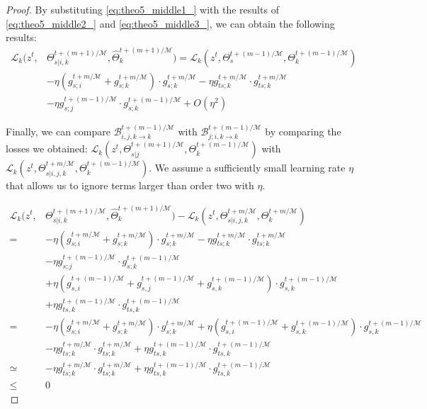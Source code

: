 \begin{proof}
By substituting \cref{eq:theo5_middle1_} with the results of \cref{eq:theo5_middle2_} and \cref{eq:theo5_middle3_}, we can obtain the following results:
\begin{align}
    \mathcal{L}_k(z^t, &\Theta_{s|i,k}^{t+(m+1)/\mathcal{M}}, \hat{\Theta}_k^{t+(m+1)/\mathcal{M}}) = \mathcal{L}_k (z^t, \Theta_s^{t+(m-1)/\mathcal{M}}, \Theta_k^{t+(m-1)/\mathcal{M}})\\
    &- \eta (g_{s;i}^{t+m/\mathcal{M}}+g_{s;k}^{t+m/\mathcal{M}})\cdot g_{s;k}^{t+m/\mathcal{M}} - \eta g_{ts;k}^{t+m/\mathcal{M}}\cdot g_{ts;k}^{t+m/\mathcal{M}} \\
    &- \eta g_{s;j}^{t+(m-1)/\mathcal{M}}\cdot g_{s;k}^{t+(m-1)/\mathcal{M}}+ O(\eta^2)
\end{align}

Finally, we can compare $\mathcal{B}_{i,j,k \rightarrow k}^{t+(m-1)/\mathcal{M}}$ with $\mathcal{B}_{j; i,k \rightarrow k}^{t+(m-1)/\mathcal{M}}$ by comparing the losses we obtained: $\mathcal{L}_k(z^t, \Theta_{s|j}^{t+(m+1)/\mathcal{M}}, \Theta_k^{t+(m-1)/\mathcal{M}})$ with $\mathcal{L}_k(z^t, \Theta_{s|i,j,k}^{t+m/\mathcal{M}}, \Theta_k^{t+(m-1)/\mathcal{M}})$. We assume a sufficiently small learning rate $\eta$ that allows us to ignore terms larger than order two with $\eta$.

\begin{align}
    \mathcal{L}_k(z^t, &\Theta_{s|i,k}^{t+(m+1)/\mathcal{M}}, \hat{\Theta}_k^{t+(m+1)/\mathcal{M}}) - \mathcal{L}_k(z^t, \Theta_{s|i,j,k}^{t+m/\mathcal{M}}, \Theta_k^{t+m/\mathcal{M}})\\
    =& - \eta (g_{s;i}^{t+m/\mathcal{M}}+g_{s;k}^{t+m/\mathcal{M}})\cdot g_{s;k}^{t+m/\mathcal{M}} - \eta g_{ts;k}^{t+m/\mathcal{M}}\cdot g_{ts;k}^{t+m/\mathcal{M}} \\
    &- \eta g_{s;j}^{t+(m-1)/\mathcal{M}}\cdot g_{s;k}^{t+(m-1)/\mathcal{M}}\\
    &+ \eta (g_{s,i}^{t+(m-1)/\mathcal{M}} + g_{s,j}^{t+(m-1)/\mathcal{M}} + g_{s,k}^{t+(m-1)/\mathcal{M}})\cdot g_{s,k}^{t+(m-1)/\mathcal{M}}\\
    &+ \eta g_{ts,k}^{t+(m-1)/\mathcal{M}}\cdot g_{ts,k}^{t+(m-1)/\mathcal{M}}\\
    =& - \eta (g_{s;i}^{t+m/\mathcal{M}}+g_{s;k}^{t+m/\mathcal{M}})\cdot g_{s;k}^{t+m/\mathcal{M}} + \eta (g_{s,i}^{t+(m-1)/\mathcal{M}} + g_{s,k}^{t+(m-1)/\mathcal{M}})\cdot g_{s,k}^{t+(m-1)/\mathcal{M}} \\
    & - \eta g_{ts;k}^{t+m/\mathcal{M}}\cdot g_{ts;k}^{t+m/\mathcal{M}} + \eta g_{ts,k}^{t+(m-1)/\mathcal{M}}\cdot g_{ts,k}^{t+(m-1)/\mathcal{M}} \\
    \simeq& - \eta g_{ts;k}^{t+m/\mathcal{M}}\cdot g_{ts;k}^{t+m/\mathcal{M}} + \eta g_{ts,k}^{t+(m-1)/\mathcal{M}}\cdot g_{ts,k}^{t+(m-1)/\mathcal{M}} \label{eq:theo5_last2}\\
    \leq& 0 \label{eq:theo5_final}
\end{align}


\end{proof}
